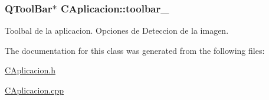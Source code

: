 \subsubsection[{\texorpdfstring{toolbar\+\_\+}{toolbar_}}]{\setlength{\rightskip}{0pt plus 5cm}Q\+Tool\+Bar$\ast$ C\+Aplicacion\+::toolbar\+\_\+\hspace{0.3cm}{\ttfamily [private]}}\hypertarget{classCAplicacion_a2dca58bda4c34c0f76d8c95fcbba064c}{}\label{classCAplicacion_a2dca58bda4c34c0f76d8c95fcbba064c}


Toolbal de la aplicacion. Opciones de Deteccion de la imagen. 



The documentation for this class was generated from the following files\+:\begin{DoxyCompactItemize}
\item 
\hyperlink{CAplicacion_8h}{C\+Aplicacion.\+h}\item 
\hyperlink{CAplicacion_8cpp}{C\+Aplicacion.\+cpp}\end{DoxyCompactItemize}

